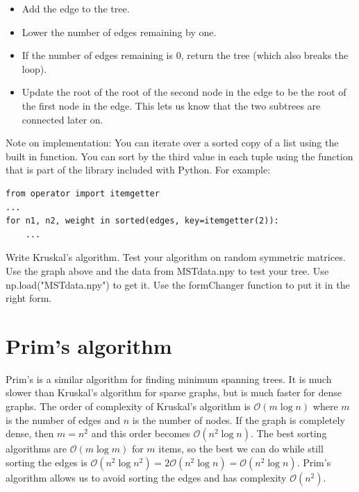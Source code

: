 \begin{itemize}
\begin{itemize}
		\begin{itemize}

		\item Add the edge to the tree.

		\item Lower the number of edges remaining by one.

		\item If the number of edges remaining is 0, return the tree (which also breaks the loop).

		\item Update the root of the root of the second node in the edge to be the root of the first node in the edge.
			This lets us know that the two subtrees are connected later on.

		\end{itemize}

	\end{itemize}

\end{itemize}
Note on implementation: You can iterate over a sorted copy of a list using the built in  function.
You can sort by the third value in each tuple using the  function that is part of the  library included with Python.
For example:
\begin{lstlisting}
from operator import itemgetter
...
for n1, n2, weight in sorted(edges, key=itemgetter(2)):
    ...
\end{lstlisting}

\begin{problem}
Write Kruskal's algorithm.
Test your algorithm on random symmetric matrices.
Use the graph above and the data from MSTdata.npy to test your tree.
Use np.load("MSTdata.npy") to get it.
Use the formChanger function to put it in the right form.
\end{problem}

\section*{Prim's algorithm}

Prim's is a similar algorithm for finding minimum spanning trees.
It  is much slower than Kruskal's algorithm for sparse graphs, but is much faster for dense graphs.
The order of complexity of Kruskal's algorithm is $\mathcal{O}\left( m \log{n} \right)$ where $m$ is the number of edges and $n$ is the number of nodes.
If the graph is completely dense, then $m=n^2$ and this order becomes $\mathcal{O}\left( n^2 \log{n}\right)$.
The best sorting algorithms are $\mathcal{O}\left( m \log{m}\right)$ for $m$ items, so the best we can do while still sorting the edges is $\mathcal{O}\left( n^2 \log{n^2}\right) = 2 \mathcal{O}\left( n^2 \log{n}\right) = \mathcal{O}\left( n^2 \log{n} \right)$.
Prim's algorithm allows us to avoid sorting the edges and has complexity $\mathcal{O} \left( n^2 \right)$.

